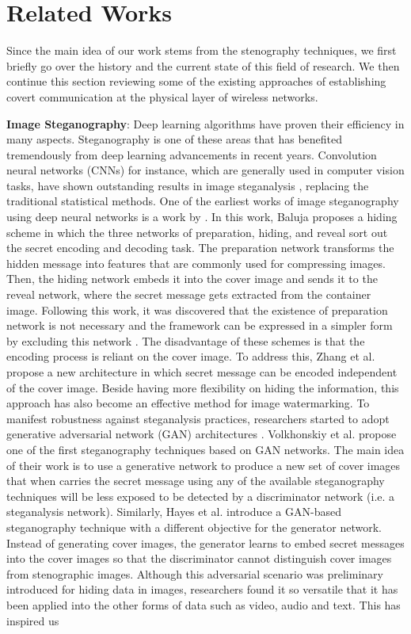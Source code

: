 \section{Related Works}
\label{s:related}
Since the main idea of our work stems from the stenography techniques, we first briefly go over the history and the current state of this field of research. We then continue this section reviewing some of the existing approaches of establishing covert communication at the physical layer of wireless networks.


\textbf{Image Steganography}: Deep learning algorithms have proven their efficiency in many aspects. Steganography is one of these areas that has benefited tremendously from deep learning advancements in recent years. Convolution neural networks (CNNs) for instance, which are generally used in computer vision tasks, have shown outstanding results in image steganalysis \cite{tan2014stacked,qian2015deep,xu2016structural}, replacing the traditional statistical methods. One of the earliest works of image steganography using deep neural networks is a work by \cite{baluja2017hiding}. In this work, Baluja proposes a hiding scheme in which the three networks of preparation, hiding, and reveal sort out the secret encoding and decoding task. The preparation network transforms the hidden message into features that are commonly used for compressing images. Then, the hiding network embeds it into the cover image and sends it to the reveal network, where the secret message gets extracted from the container image. Following this work, it was discovered that the existence of preparation network is not necessary and the framework can be expressed in a simpler form by excluding this network \cite{zhang2021brief}. The disadvantage of these schemes is that the encoding process is reliant on the cover image. To address this, Zhang et al. \cite{zhang2020udh} propose a new architecture in which secret message can be encoded independent of the cover image. Beside having more flexibility on hiding the information, this approach has also become an effective method for image watermarking. To manifest robustness against steganalysis practices, researchers started to adopt generative adversarial network (GAN) architectures \cite{goodfellow2014generative}. Volkhonskiy et al. \cite{volkhonskiy2020steganographic} propose one of the first steganography techniques based on GAN networks. The main idea of their work is to use a generative network to produce a new set of cover images that when carries the secret message using any of the available steganography techniques will be less exposed to be detected by a discriminator network (i.e. a steganalysis network). Similarly, Hayes et al. \cite{hayes2017generating} introduce a GAN-based steganography technique with a different objective for the generator network. Instead of generating cover images, the generator learns to embed secret messages into the cover images so that the discriminator cannot distinguish cover images from stenographic images. Although this adversarial scenario was preliminary introduced for hiding data in images, researchers found it so versatile that it has been applied into the other forms of data such as video, audio and text. This has inspired us 